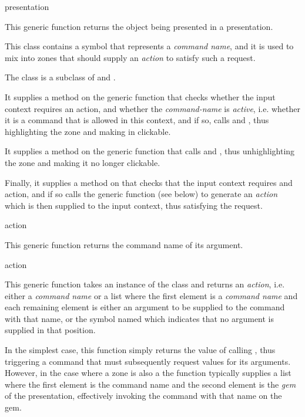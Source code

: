  {presentation}

This generic function returns the object being presented in a
presentation. 


This class contains a symbol that represents a \emph{command name},
and it is used to mix into zones that should supply an \emph{action}
to satisfy such a request.

The class  is a subclass of  and
.  

It supplies a method on the generic function  that checks
whether the input context requires an action, and whether the
\emph{command-name} is \emph{active}, i.e. whether it is a command
that is allowed in this context, and if so, calls  and
, thus highlighting the zone and making in clickable.

It supplies a method on the generic function  that calls
 and ,  thus unhighlighting the zone
and making it no longer clickable. 

Finally, it supplies a method on  that checks that
the input context requires and action, and if so calls the generic
function  (see below) to generate an \emph{action} which
is then supplied to the input context, thus satisfying the request.

 {action}

This generic function returns the command name of its argument. 

 {action}

This generic function takes an instance of the  class
and returns an \emph{action}, i.e. either a \emph{command name} or a
list where the first element is a \emph{command name} and each
remaining element is either an argument to be supplied to the command
with that name, or the symbol named   which indicates that no
argument is supplied in that position.

In the simplest case, this function simply returns the value of
calling , thus triggering a command that must
subsequently request values for its arguments.  However, in the case
where a zone is also a  the function 
typically supplies a list where the first element is the command name
and the second element is the \emph{gem} of the presentation,
effectively invoking the command with that name on the gem.

